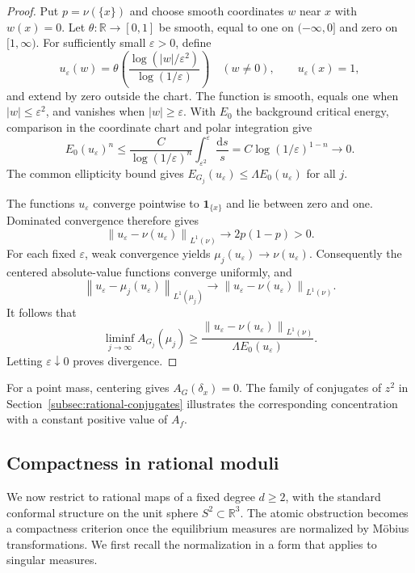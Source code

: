 \documentclass[10pt,a4paper]{amsart}
\newcommand{\R}{\mathbb R}
\newcommand{\norm}[1]{\left\lVert #1\right\rVert}
\newcommand{\dd}{\mathrm d}
\numberwithin{equation}{section}
\begin{document}
\begin{proof}
Put $p=\nu(\{x\})$ and choose smooth coordinates $w$ near $x$ with $w(x)=0$. Let $\theta\colon\R\to[0,1]$ be smooth, equal to one on $(-\infty,0]$ and zero on $[1,\infty)$. For sufficiently small $\varepsilon>0$, define
\begin{equation}\label{eq:log-cutoff}
 u_\varepsilon(w)=
 \theta\left(\frac{\log(|w|/\varepsilon^2)}{\log(1/\varepsilon)}\right)
 \quad(w\ne0),\qquad u_\varepsilon(x)=1,
\end{equation}
and extend by zero outside the chart. The function is smooth, equals one when $|w|\le\varepsilon^2$, and vanishes when $|w|\ge\varepsilon$. With $E_0$ the background critical energy, comparison in the coordinate chart and polar integration give
\begin{equation}\label{eq:cutoff-energy}
 E_0(u_\varepsilon)^n
 \le\frac{C}{\log(1/\varepsilon)^n}
        \int_{\varepsilon^2}^{\varepsilon}\frac{\dd s}{s}
 =C\log(1/\varepsilon)^{1-n}\longrightarrow0.
\end{equation}
The common ellipticity bound gives $E_{G_j}(u_\varepsilon)\le\Lambda E_0(u_\varepsilon)$ for all $j$.

The functions $u_\varepsilon$ converge pointwise to $\mathbf1_{\{x\}}$ and lie between zero and one. Dominated convergence therefore gives
\[
 \norm{u_\varepsilon-\nu(u_\varepsilon)}_{L^1(\nu)}
 \longrightarrow 2p(1-p)>0.
\]
For each fixed $\varepsilon$, weak convergence yields $\mu_j(u_\varepsilon)\to\nu(u_\varepsilon)$. Consequently the centered absolute-value functions converge uniformly, and
\[
 \norm{u_\varepsilon-\mu_j(u_\varepsilon)}_{L^1(\mu_j)}
 \longrightarrow
 \norm{u_\varepsilon-\nu(u_\varepsilon)}_{L^1(\nu)}.
\]
It follows that
\[
 \liminf_{j\to\infty}A_{G_j}(\mu_j)
 \ge\frac{\norm{u_\varepsilon-\nu(u_\varepsilon)}_{L^1(\nu)}}
          {\Lambda E_0(u_\varepsilon)}.
\]
Letting $\varepsilon\downarrow0$ proves divergence.
\end{proof}

For a point mass, centering gives $A_G(\delta_x)=0$. The family of conjugates of $z^2$ in Section~\ref{subsec:rational-conjugates} illustrates the corresponding concentration with a constant positive value of $A_f$.

\subsection{Compactness in rational moduli}\label{subsec:moduli}

We now restrict to rational maps of a fixed degree $d\ge2$, with the standard conformal structure on the unit sphere $S^2\subset\R^3$. The atomic obstruction becomes a compactness criterion once the equilibrium measures are normalized by M\"obius transformations. We first recall the normalization in a form that applies to singular measures.
\end{document}
